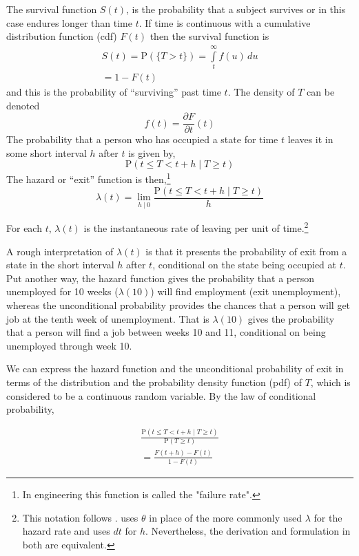 \documentclass[
  11pt,
]{article}
\numberwithin{equation}{section}
\begin{document}
The survival function \(S(t)\), is the probability that a subject
survives or in this case endures longer than time \(t\). If time is
continuous with a cumulative distribution function (cdf) \(F(t)\) then
the survival function is \begin{equation}
\begin{gathered}
S(t) = \mathrm{P}(\{T > t\}) = \int\limits_{t}^{\infty} f(u)\, du \\[8pt]
= 1 - F(t)
\end{gathered}
\end{equation} and this is the probability of ``surviving'' past time
\(t\). The density of \(T\) can be denoted \[
f(t) = \frac{\partial F}{\partial t}(t)
\] The probability that a person who has occupied a state for time \(t\)
leaves it in some short interval \(h\) after \(t\) is given by, \[
\mathrm{P}(t \leq T < t + h \; | \; T \geq t)
\] The hazard or ``exit'' function is
then,\footnote{In engineering this function is called the "failure rate".}
\begin{equation}
\lambda(t) = \lim_{h \;|\, 0} \frac{\mathrm{P}(t \leq T < t + h \; | \; T \geq t)}{h}
\end{equation}

For each \(t\), \(\lambda(t)\) is the instantaneous rate of leaving per
unit of
time.\footnote{This notation follows \cite{Wool01}. \cite{Lanc90} uses $\theta$ in place of the more commonly used $\lambda$ for the hazard rate and uses $dt$ for $h$. Nevertheless, the derivation and formulation in both are equivalent.}

A rough interpretation of \(\lambda(t)\) is that it presents the
probability of exit from a state in the short interval \(h\) after
\(t\), conditional on the state being occupied at \(t\). Put another
way, the hazard function gives the probability that a person unemployed
for 10 weeks (\(\lambda(10)\)) will find employment (exit unemployment),
whereas the unconditional probability provides the chances that a person
will get job at the tenth week of unemployment. That is \(\lambda(10)\)
gives the probability that a person will find a job between weeks 10 and
11, conditional on being unemployed through week 10.

We can express the hazard function and the unconditional probability of
exit in terms of the distribution and the probability density function
(pdf) of \(T\), which is considered to be a continuous random variable.
By the law of conditional probability,

\begin{equation}
\begin{gathered}
\frac{\mathrm{P}(t \leq T < t + h \; | \; T \geq t)}{\mathrm{P}(T \geq t)} \\[8pt]
= \frac{F(t + h) - F(t)}{1 - F(t)}
\end{gathered}
\end{equation}
\end{document}
